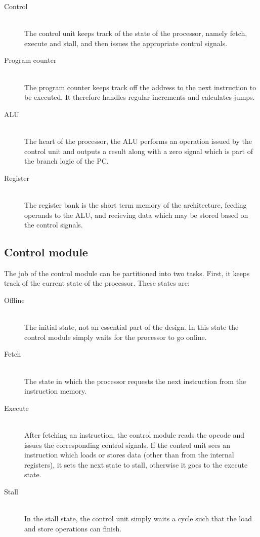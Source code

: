 \begin{description}
  \item[Control] \hfill \\
  The control unit keeps track of the state of the processor, namely fetch, execute and stall, and then issues the appropriate control signals.  
  \item[Program counter] \hfill \\
  The program counter keeps track off the address to the next instruction to be executed. It therefore handles regular increments and calculates jumps.
  \item[ALU] \hfill \\
  The heart of the processor, the ALU performs an operation issued by the control unit and outputs a result along with a zero signal which is part of the branch logic of the PC.
  \item[Register] \hfill \\
  The register bank is the short term memory of the architecture, feeding operands to the ALU, and recieving data which may be stored based on the control signals.
\end{description}

\subsection{Control module}
The job of the control module can be partitioned into two tasks.
First, it keeps track of the current state of the processor.
These states are:
\begin{description}
  \item[Offline] \hfill \\
  The initial state, not an essential part of the design. In this state the control module simply waits for the processor to go online.
  \item[Fetch] \hfill \\
  The state in which the processor requests the next instruction from the instruction memory.
  \item[Execute] \hfill \\
  After fetching an instruction, the control module reads the opcode and issues the corresponding control signals.
  If the control unit sees an instruction which loads or stores data (other than from the internal registers), it sets the next state to stall, otherwise it goes to the execute state.
  \item[Stall] \hfill \\
  In the stall state, the control unit simply waits a cycle such that the load and store operations can finish.
\end{description}

